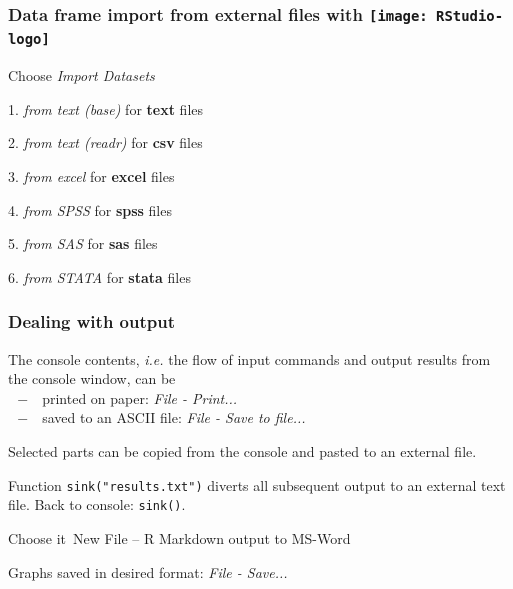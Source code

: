 \documentclass[handout,12pt]{beamer}
\newcommand{\RSlogo}[1]{\texttt{[image: RStudio-logo]}}
\begin{document}
\begin{frame}[fragile]
\frametitle{Data frame import from external files with  \RSlogo{height=2.2em}}

Choose {\it Import Datasets} 

\bi
\item[ ] 
\pause 
\item[1.] {\it from text (base)} for \textbf{text} files
\item[2.] {\it from text (readr)} for \textbf{csv} files
\vspace*{0.3cm}
\item[3.] {\it from excel} for \textbf{excel} files
\vspace*{0.3cm}
\item[4.] {\it from SPSS} for \textbf{spss} files
\item[5.] {\it from SAS} for \textbf{sas} files
\item[6.] {\it from STATA} for \textbf{stata} files
\ei
\end{frame}

\begin{frame}\frametitle{Dealing with output}
\bi
\item The console contents, \emph{i.e.} the flow of input commands and output results 
from the console window, can be \\
$ \ \ - \ \ $ printed on paper: {\it File - Print...} \\
$ \ \ - \ \ $ saved to an ASCII file: {\it File - Save to file...}
\pause\medskip
\item Selected parts can be copied from the console and pasted to an external file.
\pause\medskip
\item
Function {\tt sink("results.txt")} diverts 
all subsequent output to an external text file.
Back to console: {\tt sink()}.
\pause\medskip
\item Choose {it\ New File -- R Markdown} output to MS-Word
\pause\medskip
\item Graphs saved in desired format: {\it File - Save...}  
\ei
\end{frame}
\end{document}
